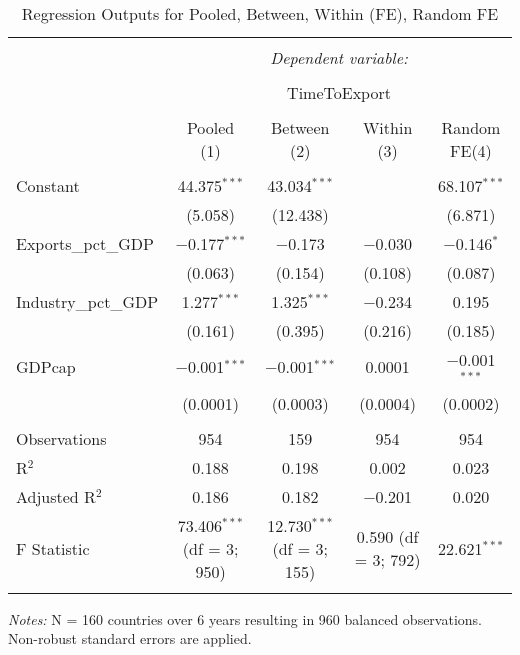 \documentclass[a4paper]{article}
\begin{document}
\begin{table}[!htbp] 
\begin{adjustwidth}{-0cm}{-0cm}
\begin{threeparttable}
\small
\captionsetup{font=small, justification=raggedright,singlelinecheck=false}
  \caption{Regression Outputs for Pooled, Between, Within (FE), Random FE} 
  \label{} 
\begin{tabular}{@{\extracolsep{0pt}}lcccc} 
\\[-5.8ex]\hline 
\hline \\[-1.8ex] 
 & \multicolumn{4}{c}{\textit{Dependent variable:}} \\ 
\cline{2-5} 
\\[-1.8ex] & \multicolumn{4}{c}{TimeToExport} \\ 
\\[-1.8ex] & Pooled (1) & Between (2) & Within (3) & Random FE(4)\\ 
\hline \\[-1.8ex] 
 Constant & 44.375$^{***}$ & 43.034$^{***}$ &  & 68.107$^{***}$ \\ 
  & (5.058) & (12.438) &  & (6.871) \\ 
  Exports\_pct\_GDP & $-$0.177$^{***}$ & $-$0.173 & $-$0.030 & $-$0.146$^{*}$ \\ 
  & (0.063) & (0.154) & (0.108) & (0.087) \\ 
  Industry\_pct\_GDP & 1.277$^{***}$ & 1.325$^{***}$ & $-$0.234 & 0.195 \\ 
  & (0.161) & (0.395) & (0.216) & (0.185) \\ 
  GDPcap & $-$0.001$^{***}$ & $-$0.001$^{***}$ & 0.0001 & $-$0.001$^{***}$ \\ 
  & (0.0001) & (0.0003) & (0.0004) & (0.0002) \\ 
 \hline \\[-1.8ex] 
Observations & 954 & 159 & 954 & 954 \\ 
R$^{2}$ & 0.188 & 0.198 & 0.002 & 0.023 \\ 
Adjusted R$^{2}$ & 0.186 & 0.182 & $-$0.201 & 0.020 \\ 
F Statistic & 73.406$^{***}$ (df = 3; 950) & 12.730$^{***}$ (df = 3; 155) & 0.590 (df = 3; 792) & 22.621$^{***}$ \\ 
\hline 
\hline \\
[-3.5ex] 
\end{tabular} 
\begin{tablenotes}
      \small
      \item\textit{Notes:} N = 160 countries over 6 years resulting in 960 balanced observations. Non-robust standard errors are applied.
    \end{tablenotes}
\end{threeparttable}
\end{adjustwidth}
\end{table}
\end{document}

